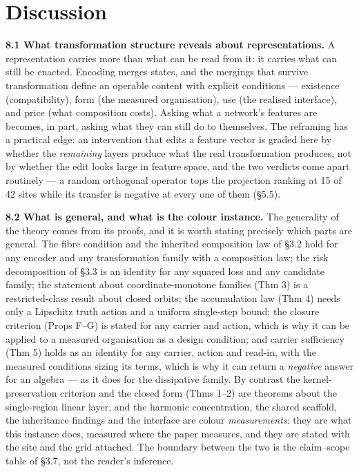 \section{Discussion}

\textbf{8.1 What transformation structure reveals about representations.} A representation carries more than what can be read from it: it carries what can still be enacted. Encoding merges states, and the mergings that survive transformation define an operable content with explicit conditions --- existence (compatibility), form (the measured organisation), use (the realised interface), and price (what composition costs). Asking what a network's features are becomes, in part, asking what they can still do to themselves. The reframing has a practical edge: an intervention that edits a feature vector is graded here by whether the \textit{remaining} layers produce what the real transformation produces, not by whether the edit looks large in feature space, and the two verdicts come apart routinely --- a random orthogonal operator tops the projection ranking at 15 of 42 sites while its transfer is negative at every one of them (\S{}5.5).

\textbf{8.2 What is general, and what is the colour instance.} The generality of the theory comes from its proofs, and it is worth stating precisely which parts are general. The fibre condition and the inherited composition law of \S{}3.2 hold for any encoder and any transformation family with a composition law; the risk decomposition of \S{}3.3 is an identity for any squared loss and any candidate family; the statement about coordinate-monotone families (Thm 3) is a restricted-class result about closed orbits; the accumulation law (Thm 4) needs only a Lipschitz truth action and a uniform single-step bound; the closure criterion (Props F--G) is stated for any carrier and action, which is why it can be applied to a measured organisation as a design condition; and carrier sufficiency (Thm 5) holds as an identity for any carrier, action and read-in, with the measured conditions sizing its terms, which is why it can return a \textit{negative} answer for an algebra --- as it does for the dissipative family. By contrast the kernel-preservation criterion and the closed form (Thms 1--2) are theorems about the single-region linear layer, and the harmonic concentration, the shared scaffold, the inheritance findings and the interface are colour \textit{measurements}: they are what this instance does, measured where the paper measures, and they are stated with the site and the grid attached. The boundary between the two is the claim--scope table of \S{}3.7, not the reader's inference.

